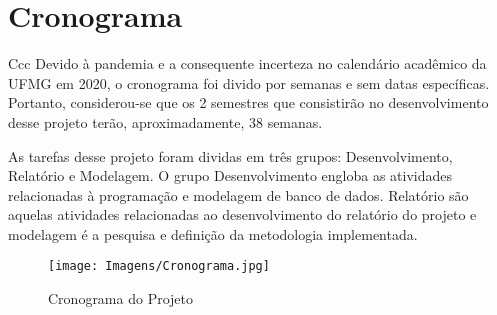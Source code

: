 \section{Cronograma}
Ccc\justifying
Devido à pandemia e a consequente incerteza no calendário acadêmico da UFMG em 2020, o cronograma foi divido por semanas e sem datas específicas. Portanto, considerou-se que os 2 semestres que consistirão no desenvolvimento desse projeto terão, aproximadamente, 38 semanas.

As tarefas desse projeto foram dividas em três grupos: Desenvolvimento, Relatório e Modelagem. O grupo  Desenvolvimento engloba as atividades relacionadas à programação e modelagem de banco de dados. Relatório são aquelas atividades relacionadas ao desenvolvimento do relatório do projeto e modelagem é a pesquisa e definição da metodologia implementada.

    \begin{figure}[H]
    \texttt{[image: Imagens/Cronograma.jpg]}
    \centering
    \caption{Cronograma do Projeto}
    \label{Schedule}
    \end{figure}